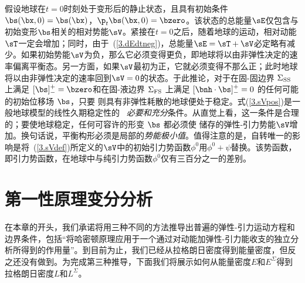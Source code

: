 假设地球在$t=0$时刻处于变形后的静止状态，且具有初始条件$\bs(\bx,0)=\bs(\bx)$，$\p_t\bs(\bx,0)=\bzero$。该状态的总能量$\sE$仅包含与初始变形$\bs$相关的相对势能$\sV$。紧接在$t=0$之后，随着地球的运动，相对动能$\sT$一定会增加；同时，由于~(\ref{3.dEdtneg})，总能量$\sE=\sT+\sV$必定略有减少。如果初始势能$\sV$为负，那么它必须变得更负，即地球将以由非弹性决定的速率偏离平衡态。另一方面，如果$\sV$最初为正，它就必须变得不那么正；此时地球将以由非弹性决定的速率回到$\sV=0$的状态。于此推论，对于在固-固边界 $\Sigma_{\rm SS}$ 上满足 $[\bs]^+_-=\bzero$和在固-液边界 $\Sigma_{\rm FS}$ 上满足 $[\bnh\cdot\bs]^+_-=0$ 的任何可能的初始位移场 $\bs$，只要
\eq
\label{3.sVpos}
\sV {}
\en
则具有非弹性耗散的地球便处于稳定。式(\ref{3.sVpos})是一般地球模型的线性久期稳定性的~{\em 
必要和充分\/}条件。从直觉上看，这一条件是合理的；要使地球稳定，任何可容许的形变 $\bs$ 都必须使 储存的弹性-引力势能$\sV$增加。换句话说，平衡构形必须是局部的{\em 势能极小值\/}。值得注意的是，自转唯一的影响是将~(\ref{3.sVdef})所定义的$\sV$中的初始引力势函数$\phi^0$用$\phi^0+\psi$替换。该势函数，即引力势函数，在地球中与纯引力势函数$\phi^0$仅有三百分之一的差别。
%
%
%

\renewcommand{\thesection}{$\!\!\!\raise1.3ex\hbox{$\star$}\!\!$
\arabic{chapter}.\arabic{section}}
\section{第一性原理变分分析}
%
\label{3.sec.firstprin}
\renewcommand{\thesection}{\arabic{chapter}.\arabic{section}}

在本章的开头，我们承诺将用三种不同的方法推导出普遍的弹性-引力运动方程和边界条件，包括“将哈密顿原理应用于一个通过对动能加弹性-引力能收支的独立分析所得到的作用量”。到目前为止，我们已经从拉格朗日密度得到能量密度，但反之还没有做到。为完成第三种推导，下面我们将展示如何从能量密度$E$和$E^{\Sigma}$得到拉格朗日密度$L$和$L^{\Sigma}$。

